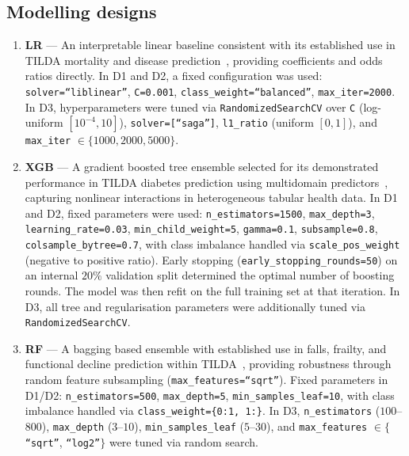 \subsection{Modelling designs}\label{sc:modelling_designs}
\begin{enumerate}
    \item \textbf{\gls{LR}} --- An interpretable linear baseline consistent with its established use in \gls{TILDA} mortality and disease prediction~\cite{matthewsPredictingMortalityIrish2022}, providing coefficients and odds ratios directly. In D1 and D2, a fixed configuration was used: \texttt{solver=``liblinear''}, \texttt{C=0.001}, \texttt{class\_weight=``balanced''}, \texttt{max\_iter=2000}. In D3, hyperparameters were tuned via \texttt{RandomizedSearchCV} over \texttt{C} (log-uniform $[10^{-4}, 10]$), \texttt{solver=[``saga'']}, \texttt{l1\_ratio} (uniform $[0,1]$), and \texttt{max\_iter} $\in \{1000, 2000, 5000\}$.
    \item \textbf{\gls{XGB}} --- A gradient boosted tree ensemble selected for its demonstrated performance in \gls{TILDA} diabetes prediction using multidomain predictors~\cite{xuTailoredMachineLearning2023}, capturing nonlinear interactions in heterogeneous tabular health data. In D1 and D2, fixed parameters were used: \texttt{n\_estimators=1500}, \texttt{max\_depth=3}, \texttt{learning\_rate=0.03}, \texttt{min\_child\_weight=5}, \texttt{gamma=0.1}, \texttt{subsample=0.8}, \texttt{colsample\_bytree=0.7}, with class imbalance handled via \texttt{scale\_pos\_weight} (negative to positive ratio). Early stopping (\texttt{early\_stopping\_rounds=50}) on an internal $20\%$ validation split determined the optimal number of boosting rounds. The model was then refit on the full training set at that iteration. In D3, all tree and regularisation parameters were additionally tuned via \texttt{RandomizedSearchCV}.
    \item \textbf{\gls{RF}} --- A bagging based ensemble with established use in falls, frailty, and functional decline prediction within \gls{TILDA}~\cite{donoghueUsingConditionalInference2023, moguilnerImportanceAgePrediction2021}, providing robustness through random feature subsampling (\texttt{max\_features=``sqrt''}). Fixed parameters in D1/D2: \texttt{n\_estimators=500}, \texttt{max\_depth=5}, \texttt{min\_samples\_leaf=10}, with class imbalance handled via \texttt{class\_weight=\{0:1, 1:\}}. In D3, \texttt{n\_estimators} ($100$--$800$), \texttt{max\_depth} ($3$--$10$), \texttt{min\_samples\_leaf} ($5$--$30$), and \texttt{max\_features} $\in \{$\texttt{``sqrt''}, \texttt{``log2''}$\}$ were tuned via random search.

\end{enumerate}
